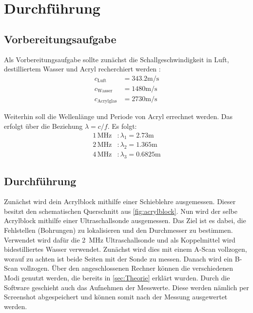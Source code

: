 \section{Durchführung}
\label{sec:Durchführung}

\subsection{Vorbereitungsaufgabe}

Als Vorbereitungsaufgabe sollte zunächst die Schallgeschwindigkeit in Luft, destilliertem Wasser und Acryl recherchiert werden \cite{schallgeschw}:
\begin{align*}
    c_\text{Luft} &= 343.2 \unit{\meter} / \unit{\second} \\
    c_\text{Wasser} &= 1480 \unit{\meter} / \unit{\second} \\
    c_\text{Acrylglas} &= 2730 \unit{\meter} / \unit{\second}
\end{align*} 

Weiterhin soll die Wellenlänge und Periode von Acryl errechnet werden. Das erfolgt über die Beziehung $\lambda = c / f$.
Es folgt:
\begin{align*}
    1 \, \unit{\mega\hertz}&: \lambda_1 =  2.73 \unit\meter\\
    2 \, \unit{\mega\hertz}&: \lambda_2 =  1.365\unit\meter\\
    4 \, \unit{\mega\hertz}&: \lambda_3 =  0.6825 \unit\meter
\end{align*}

\subsection{Durchführung}

Zunächst wird dein Acrylblock mithilfe einer Schieblehre ausgemessen.
Dieser besitzt den schematischen Querschnitt aus \autoref{fig:acrylblock}.
Nun wird der selbe Acrylblock mithilfe einer Ultraschallsonde ausgemessen.
Das Ziel ist es dabei, die Fehlstellen (Bohrungen) zu lokalisieren und den Durchmesser zu bestimmen. 
Verwendet wird dafür die \qty{2}{\MHz} Ultraschallsonde und als Koppelmittel wird bidestilliertes Wasser verwendet.
Zunächst wird dies mit einem A-Scan vollzogen, worauf zu achten ist beide Seiten mit der Sonde zu messen.
Danach wird ein B-Scan vollzogen.
Über den angeschlossenen Rechner können die verschiedenen Modi genutzt werden, die bereits in \autoref{sec:Theorie} erklärt wurden.
Durch die Software geschieht auch das Aufnehmen der Messwerte.
Diese werden nämlich per Screenshot abgespeichert und können somit nach der Messung ausgewertet werden.

